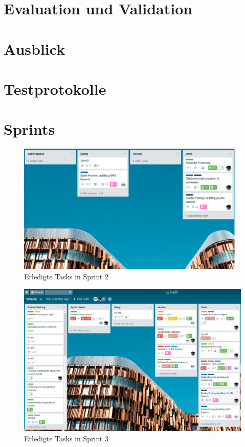 \documentclass[a4paper]{scrreprt}
\begin{document}
\chapter{Evaluation und Validation}


\chapter{Ausblick}

\appendix


\listoffigures

\listoftables

\listofmyequations \pagebreak

\printbibliography

\chapter{Testprotokolle}

\chapter{Sprints}

\begin{figure}[h!]
	\includegraphics[keepaspectratio,width=\textwidth]{SprintReview_2}
	\caption{Erledigte Tasks in Sprint 2}
\end{figure}

\begin{figure}[h!]
	\includegraphics[keepaspectratio,width=\textwidth]{SprintReview_3}
	\caption{Erledigte Tasks in Sprint 3}
\end{figure}
\end{document}
